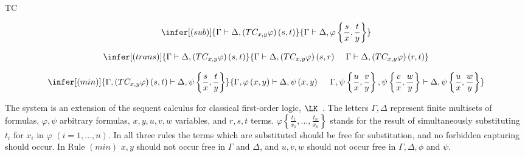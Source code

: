 \calculusAcronym{}





\maketitle

\begin{entry}{TC}  

\begin{calculus}

\[
\infer[(sub)]{\Gamma\vdash\Delta,\left(TC_{x,y}\varphi\right)\left(s,t\right)}{\Gamma\vdash\Delta,\varphi\left\{ \frac{s}{x},\frac{t}{y}\right\} }
\]

\[
\infer[(trans)]{\Gamma\vdash\Delta,\left(TC_{x,y}\varphi\right)\left(s,t\right)}
  {\Gamma\vdash\Delta,\left(TC_{x,y}\varphi\right)\left(s,r\right)\,\,\,\,\,\,\,
   \Gamma\vdash\Delta,\left(TC_{x,y}\varphi\right)\left(r,t\right)}
\]

\[
\infer[(min)]{\Gamma,\left(TC_{x,y}\varphi\right)\left(s,t\right)\vdash\Delta,\psi\left\{ \frac{s}{x},\frac{t}{y}\right\} }
  {\Gamma,\varphi\left(x,y\right)\vdash\Delta,\psi\left(x,y\right)\,\,\,\,\,\,\,\,
   \Gamma,\psi\left\{ \frac{u}{x},\frac{v}{y}\right\} ,\psi\left\{ \frac{v}{x},\frac{w}{y}\right\} \vdash
       \Delta,\psi\left\{ \frac{u}{x},\frac{w}{y}\right\} }
\]


\end{calculus}


\begin{clarifications}
  The system is an extension of the sequent calculus for classical first-order
  logic, $\LK$~. The letters $\Gamma,\Delta$ represent finite
  multisets of formulas, $\varphi,\psi$ arbitrary formulas, $x,y,u,v,w$ variables,
  and $r,s,t$ terms. 
  $\varphi\left\{ \frac{t_{1}}{x_{1}},...,\frac{t_{n}}{x_{n}}\right\}$ 
  stands for the result of simultaneously substituting $t_{i}$ for $x_{i}$ in
  $\varphi$ $(i=1,...,n)$. In all three rules the terms which are substituted
  should be free for substitution, and no forbidden capturing should occur. In
  Rule $(min)$ $x,y$ should not occur free in $\Gamma$ and $\Delta$, and $u,v,w$
  should not occur free in $\Gamma,\Delta,\phi$ and $\psi$.
\end{clarifications}


\end{entry}

